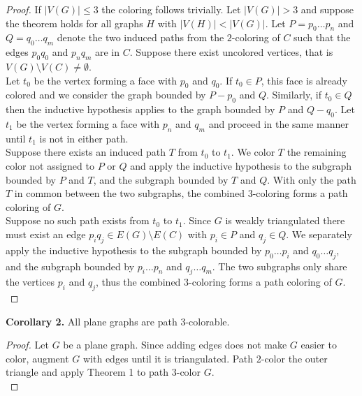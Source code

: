 \documentclass[11pt,letter]{article}
\begin{document}
\begin{proof}
\noindent If $|V(G)|\le 3$ the coloring follows trivially. Let $|V(G)|>3$ and suppose the theorem holds
for all graphs $H$ with $|V(H)|<|V(G)|$. Let $P=p_0\ldots p_n$ and $Q=q_0\ldots q_m$ denote the two induced paths from the $2$-coloring of $C$
such that the edges $p_0q_0$ and $p_nq_m$ are in $C$. Suppose there exist uncolored vertices, that is
$V(G)\setminus V(C)\ne\emptyset$.\\

\noindent Let $t_0$ be the vertex forming a face with $p_0$ and $q_0$. If $t_0\in P$, this face is already
colored and we consider the graph bounded by $P-p_0$ and $Q$. Similarly, if $t_0\in Q$ then the inductive
hypothesis applies to the graph bounded by $P$ and $Q-q_0$. Let $t_1$ be the vertex forming a face with $p_n$
and $q_m$ and proceed in the same manner until $t_1$ is not in either path.\\

\noindent Suppose there exists an induced path $T$ from $t_0$ to $t_1$. We color $T$ the remaining color not
assigned to $P$ or $Q$ and apply the inductive hypothesis to the subgraph bounded by $P$ and $T$, and the
subgraph bounded by $T$ and $Q$. With only the path $T$ in common between the two subgraphs, the combined
$3$-coloring forms a path coloring of $G$.\\

\noindent Suppose no such path exists from $t_0$ to $t_1$. Since $G$ is weakly triangulated there must exist an
edge $p_iq_j\in E(G)\setminus E(C)$ with $p_i\in P$ and $q_j\in Q$. We separately apply the inductive hypothesis
to the subgraph bounded by $p_0\ldots p_i$ and $q_0\ldots q_j$, and the subgraph bounded by $p_i\ldots p_n$ and
$q_j\ldots q_m$. The two subgraphs only share the vertices $p_i$ and $q_j$, thus the combined $3$-coloring forms
a path coloring of $G$.\\
\end{proof}

\begin{adjustwidth}{1.5em}{1.5em}
\noindent\textbf{Corollary 2.} All plane graphs are path $3$-colorable.\\
\end{adjustwidth}

\begin{proof}
Let $G$ be a plane graph. Since adding edges does not make $G$ easier to color, augment $G$ with edges until
it is triangulated. Path $2$-color the outer triangle and apply Theorem 1 to path $3$-color $G$.\\
\end{proof}
\end{document}
